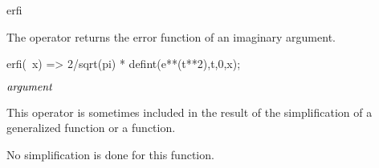\begin{Operator}{erfi}

The  operator returns the error function of an imaginary argument.

erfi(~x) => 2/sqrt(pi) * defint(e**(t**2),t,0,x); 

\begin{Syntax}
\(\meta{argument}\)
\end{Syntax}

\begin{Comments}
This operator is sometimes included in the result of the simplification
of a generalized  function or a
 function.

No simplification is done for this function.
\end{Comments}
\end{Operator}

